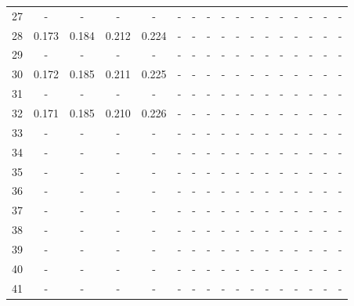 \documentclass{report}
\begin{document}
\begin{appendices}
\begin{table}
\begin{tabular}{|c|cccc|cccc|cccc|cccc|}
27 &   -   &   -   &   -   &   -   &   -   &   -   &   -   &   -   &   -   &   -   &   -   &   -   &   -   &   -   &   -   &   -   \\
28 & 0.173 & 0.184 & 0.212 & 0.224 &   -   &   -   &   -   &   -   &   -   &   -   &   -   &   -   &   -   &   -   &   -   &   -   \\
29 &   -   &   -   &   -   &   -   &   -   &   -   &   -   &   -   &   -   &   -   &   -   &   -   &   -   &   -   &   -   &   -   \\
30 & 0.172 & 0.185 & 0.211 & 0.225 &   -   &   -   &   -   &   -   &   -   &   -   &   -   &   -   &   -   &   -   &   -   &   -   \\
31 &   -   &   -   &   -   &   -   &   -   &   -   &   -   &   -   &   -   &   -   &   -   &   -   &   -   &   -   &   -   &   -   \\
32 & 0.171 & 0.185 & 0.210 & 0.226 &   -   &   -   &   -   &   -   &   -   &   -   &   -   &   -   &   -   &   -   &   -   &   -   \\
33 &   -   &   -   &   -   &   -   &   -   &   -   &   -   &   -   &   -   &   -   &   -   &   -   &   -   &   -   &   -   &   -   \\
34 &   -   &   -   &   -   &   -   &   -   &   -   &   -   &   -   &   -   &   -   &   -   &   -   &   -   &   -   &   -   &   -   \\
35 &   -   &   -   &   -   &   -   &   -   &   -   &   -   &   -   &   -   &   -   &   -   &   -   &   -   &   -   &   -   &   -   \\
36 &   -   &   -   &   -   &   -   &   -   &   -   &   -   &   -   &   -   &   -   &   -   &   -   &   -   &   -   &   -   &   -   \\
37 &   -   &   -   &   -   &   -   &   -   &   -   &   -   &   -   &   -   &   -   &   -   &   -   &   -   &   -   &   -   &   -   \\
38 &   -   &   -   &   -   &   -   &   -   &   -   &   -   &   -   &   -   &   -   &   -   &   -   &   -   &   -   &   -   &   -   \\
39 &   -   &   -   &   -   &   -   &   -   &   -   &   -   &   -   &   -   &   -   &   -   &   -   &   -   &   -   &   -   &   -   \\
40 &   -   &   -   &   -   &   -   &   -   &   -   &   -   &   -   &   -   &   -   &   -   &   -   &   -   &   -   &   -   &   -   \\
41 &   -   &   -   &   -   &   -   &   -   &   -   &   -   &   -   &   -   &   -   &   -   &   -   &   -   &   -   &   -   &   -   \\

\end{tabular}
\end{table}
\end{appendices}
\end{document}
